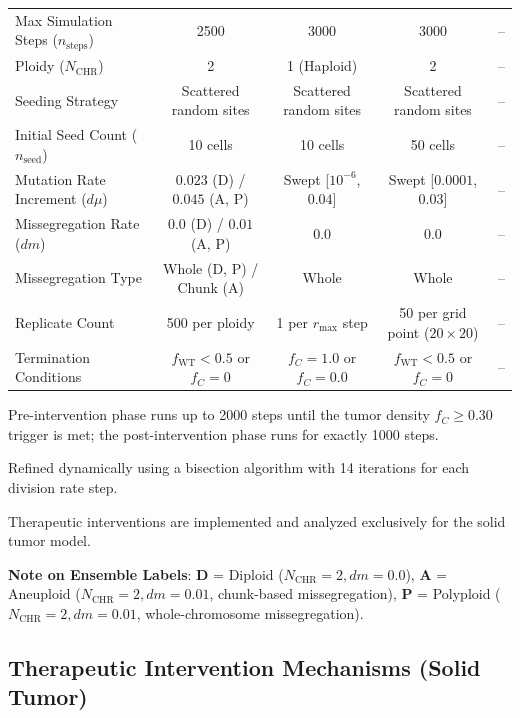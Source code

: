\documentclass[11pt,a4paper]{article}
\begin{document}
\begin{table}[htbp]
{\begin{threeparttable}
\begin{tabular}{lcccc}
Max Simulation Steps ($n_{\text{steps}}$) & 2500 & 3000 & 3000 & -- \\
Ploidy ($N_{\text{CHR}}$) & 2 & 1 (Haploid) & 2 & -- \\
Seeding Strategy & Scattered random sites & Scattered random sites & Scattered random sites & -- \\
Initial Seed Count ($n_{\text{seed}}$) & 10 cells & 10 cells & 50 cells & -- \\
Mutation Rate Increment ($d\mu$) & $0.023$ (D) / $0.045$ (A, P) & Swept [$10^{-6}$, $0.04$]\tnote{b} & Swept [$0.0001$, $0.03$] & -- \\
Missegregation Rate ($dm$) & $0.0$ (D) / $0.01$ (A, P) & $0.0$ & $0.0$ & -- \\
Missegregation Type & Whole (D, P) / Chunk (A) & Whole & Whole & -- \\
Replicate Count & 500 per ploidy & 1 per $r_{\max}$ step & 50 per grid point ($20 \times 20$) & -- \\
Termination Conditions & $f_{\text{WT}} < 0.5$ or $f_C = 0$ & $f_C = 1.0$ or $f_C = 0.0$ & $f_{\text{WT}} < 0.5$ or $f_C = 0$ & -- \\
\bottomrule
\end{tabular}
\begin{tablenotes}
\small
\item[a] Pre-intervention phase runs up to 2000 steps until the tumor density $f_C \ge 0.30$ trigger is met; the post-intervention phase runs for exactly 1000 steps.
\item[b] Refined dynamically using a bisection algorithm with 14 iterations for each division rate step.
\item[c] Therapeutic interventions are implemented and analyzed exclusively for the solid tumor model.
\item \textbf{Note on Ensemble Labels}: \textbf{D} = Diploid ($N_{\text{CHR}}=2, dm=0.0$), \textbf{A} = Aneuploid ($N_{\text{CHR}}=2, dm=0.01$, chunk-based missegregation), \textbf{P} = Polyploid ($N_{\text{CHR}}=2, dm=0.01$, whole-chromosome missegregation).
\end{tablenotes}
\end{threeparttable}
}%
\end{table}

\clearpage

\subsection{Therapeutic Intervention Mechanisms (Solid Tumor)}
\end{document}
